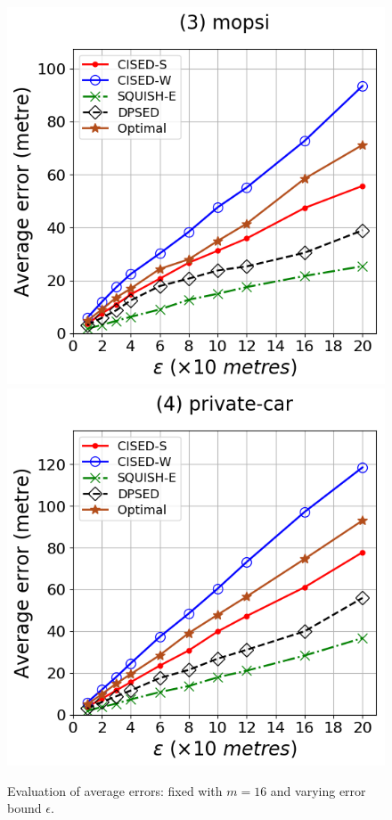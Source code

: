\begin{figure}[tb]
	\includegraphics[scale = 0.2750]{Figures/Exp-opt-error-epsilon-mopsi.png}\hspace{3ex}
	\includegraphics[scale = 0.2750]{Figures/Exp-opt-error-epsilon-private.png}
	\caption{\small Evaluation of average errors: fixed with $m=16$ and varying error bound $\epsilon$.}
	\label{fig:ae-optimal-m16}
	\vspace{-1ex}
\end{figure}




